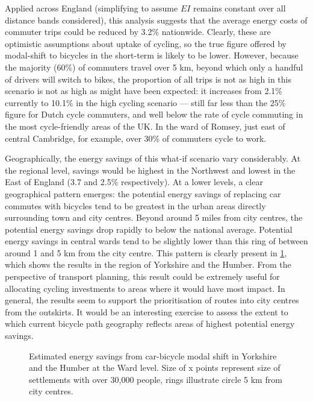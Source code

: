 Applied across England (simplifying to assume $EI$ remains constant over all
distance bands considered), this analysis suggests that the average energy
costs of commuter trips could be reduced by 3.2\% nationwide. Clearly, these
are optimistic assumptions about uptake of cycling, so the true figure
offered by modal-shift to bicycles in the short-term is likely to be
lower. However, because the majority (60\%) of commuters travel
over 5 km, beyond which only a handful of drivers will switch to bikes, the
proportion of all trips is not as high in this scenario is not as high as might
have been expected: it increases from 2.1\% currently to 10.1\% in the high
cycling scenario --- still far less than the 25\% figure for Dutch cycle
commuters, and well below the rate of cycle commuting in the most cycle-friendly
areas of the UK. In the ward of Romsey, just east of central Cambridge, for
example, over 30\% of commuters cycle to work. 

Geographically, the energy savings of this what-if scenario vary considerably.
At the regional level, savings would be highest in the Northwest and lowest in
the East of England (3.7 and 2.5\% respectively).
At a lower levels, a clear geographical pattern emerges: the potential energy
savings of replacing car commutes with bicycles tend to be greatest in the
urban areas directly surrounding town and city centres. Beyond around 5 miles
from city centres, the potential energy savings drop rapidly to below the
national average. Potential energy savings in central wards tend to be slightly
lower than this ring of between around 1 and 5 km from the city centre.
This pattern is clearly present in \cref{fcysave}, which shows the results in
the region of Yorkshire and the Humber. From the perspective of transport
planning, this result could be extremely useful for allocating cycling
investments to areas where it would have most impact.
In general, the results seem to support the prioritisation of routes into
city centres from the outskirts. It would be an interesting exercise to assess
the extent to which current bicycle path geography reflects areas of highest
potential energy savings.

\begin{figure}
 \caption[Estimated energy savings from car-bicycle modal shift]{Estimated
energy savings from car-bicycle modal shift in Yorkshire and the Humber at the
Ward level. Size of x points represent size of settlements with over 30,000 people,
rings illustrate circle 5 km from city centres.} \label{fcysave}
\end{figure}

